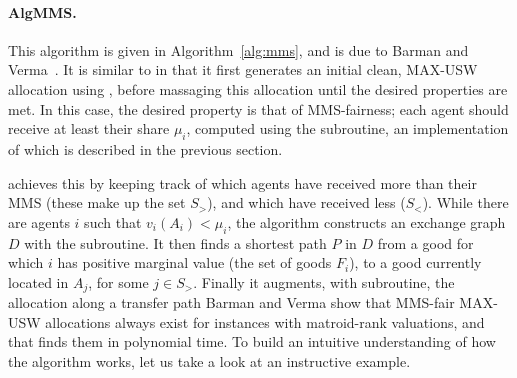 \paragraph{AlgMMS.} This algorithm is given in Algorithm~\ref{alg:mms}, and is due to Barman and Verma~\cite{barman2021existence}. It is similar to  in that it first generates an initial clean, MAX-USW allocation using , before massaging this allocation until the desired properties are met. In this case, the desired property is that of MMS-fairness; each agent should receive at least their share $\mu_i$, computed using the  subroutine, an implementation of which is described in the previous section.

 achieves this by keeping track of which agents have received more than their MMS (these make up the set $S_>$), and which have received less ($S_<$). While there are agents $i$ such that $v_i(A_i) < \mu_i$, the algorithm constructs an exchange graph $D$ with the  subroutine. It then finds a shortest path $P$ in $D$ from a good for which $i$ has positive marginal value (the set of goods $F_i$), to a good currently located in $A_j$, for some $j\in S_>$. Finally it augments, with  subroutine, the allocation along a transfer path  Barman and Verma show that MMS-fair MAX-USW allocations always exist for instances with matroid-rank valuations, and that  finds them in polynomial time. To build an intuitive understanding of how the algorithm works, let us take a look at an instructive example.

